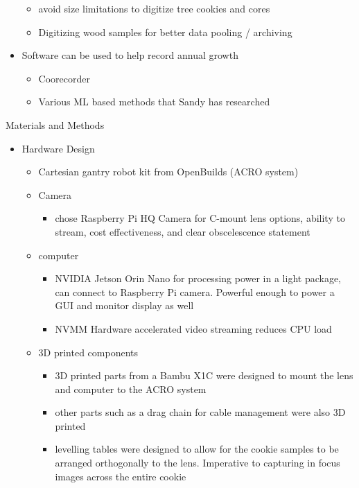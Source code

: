 \documentclass{article}
\begin{document}
\begin{outline}[itemize]
\begin{itemize}
\begin{itemize}
		\item avoid size limitations to digitize tree cookies and cores 
		\item Digitizing wood samples for better data pooling / archiving
		\end{itemize}
	\item Software can be used to help record annual growth 
		\begin{itemize}
		\item Coorecorder
		\item Various ML based methods that Sandy has researched
		\end{itemize}
	\end{itemize}
\item Materials and Methods
		\begin{itemize}
		\item Hardware Design
			\begin{itemize}
			\item Cartesian gantry robot kit from OpenBuilds (ACRO system)
			\item Camera 
				\begin{itemize}
				\item chose Raspberry Pi HQ Camera for C-mount lens options, ability to stream, cost effectiveness, and clear obscelescence statement
				\end{itemize}
			\item computer
				\begin{itemize}
				\item NVIDIA Jetson Orin Nano for processing power in a light package, can connect to Raspberry Pi camera. Powerful enough to power a GUI and monitor display as well
				\item NVMM Hardware accelerated video streaming reduces CPU load 
				\end{itemize}
			\item 3D printed components
				\begin{itemize}
				\item 3D printed parts from a Bambu X1C were designed to mount the lens and computer to the ACRO system
				\item other parts such as a drag chain for cable management were also 3D printed
				\item levelling tables were designed to allow for the cookie samples to be arranged orthogonally to the lens. Imperative to capturing in focus images across the entire cookie
				\end{itemize}
			\end{itemize}

\end{itemize}
\end{outline}
\end{document}
